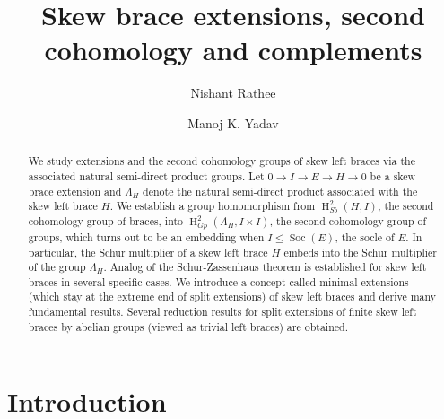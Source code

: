 \documentclass[11pt]{amsart}
\theoremstyle{thrm}
\theoremstyle{plain}
\theoremstyle{definition}
\newcommand{\Ho}{\operatorname{H} }
\newcommand{\Soc}{\operatorname{Soc} }
\numberwithin{equation}{section}
\begin{document}
\title{Skew brace extensions, second cohomology and  complements}
	

\author{Nishant Rathee}
\address{ Department of Mathematics, National Iinstitute of Technology, Tiruchirappalli-620015, India}

\author{Manoj K. Yadav}
\address{Harish-Chandra Research Institute, A CI of Homi Bhabha National Institute, Chhatnag Road, Jhunsi, Prayagraj-211 019, India}


\begin{abstract}
We study extensions and the second cohomology groups of skew left braces via the associated natural semi-direct product groups.  Let $0 \to I \to E \to H \to 0$ be a skew brace extension and $\Lambda_H$ denote  the natural semi-direct product associated with the skew left brace $H$. We establish a group homomorphism from $\Ho_{Sb}^2(H, I)$, the second cohomology group of braces, into $\Ho_{Gp}^2(\Lambda_H, I \times I)$, the second cohomology group of groups, which turns out to be an embedding when $I \le \Soc(E)$, the socle of $E$. In particular, the Schur multiplier of a skew left brace  $H$ embeds into the Schur multiplier of the group $\Lambda_H$. Analog of the Schur-Zassenhaus theorem is established for skew left braces in several specific cases. We introduce a concept called minimal  extensions (which stay at the extreme end of split extensions)  of skew left braces and derive many fundamental results.  Several reduction results for split extensions of finite skew left braces by abelian groups (viewed as  trivial left braces)  are obtained. 

\end{abstract}


\maketitle
	
\section{Introduction}
\end{document}

